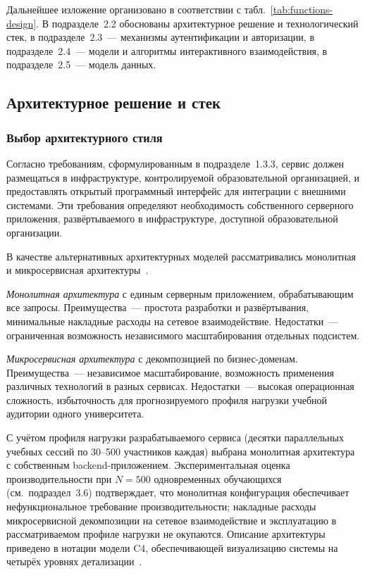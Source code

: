 Дальнейшее изложение организовано в соответствии с табл.~\ref{tab:functions-design}.
В подразделе~2.2 обоснованы архитектурное решение и технологический
стек, в подразделе~2.3~--- механизмы аутентификации и авторизации,
в подразделе~2.4~--- модели и алгоритмы интерактивного взаимодействия,
в подразделе~2.5~--- модель данных.

\subsection{Архитектурное решение и стек}

\subsubsection{Выбор архитектурного стиля}

Согласно требованиям, сформулированным в подразделе~1.3.3, сервис
должен размещаться в инфраструктуре, контролируемой образовательной
организацией, и предоставлять открытый программный интерфейс
для интеграции с внешними системами. Эти требования определяют
необходимость собственного серверного приложения, развёртываемого
в инфраструктуре, доступной образовательной организации.

В качестве альтернативных архитектурных моделей рассматривались
монолитная и микросервисная архитектуры~\cite{fowler_poeaa,kleppmann2017}.

\emph{Монолитная архитектура} с единым серверным приложением,
обрабатывающим все запросы. Преимущества~--- простота разработки
и развёртывания, минимальные накладные расходы на сетевое
взаимодействие. Недостатки~--- ограниченная возможность
независимого масштабирования отдельных подсистем.

\emph{Микросервисная архитектура} с декомпозицией по бизнес-доменам.
Преимущества~--- независимое масштабирование, возможность применения
различных технологий в разных сервисах. Недостатки~--- высокая
операционная сложность, избыточность для прогнозируемого профиля
нагрузки учебной аудитории одного университета.

С учётом профиля нагрузки разрабатываемого сервиса (десятки
параллельных учебных сессий по 30--500 участников каждая) выбрана
монолитная архитектура с собственным backend-приложением.
Экспериментальная оценка производительности при $N = 500$
одновременных обучающихся (см.~подраздел~3.6) подтверждает, что
монолитная конфигурация обеспечивает нефункциональное требование
производительности; накладные расходы микросервисной декомпозиции
на сетевое взаимодействие и эксплуатацию в рассматриваемом профиле
нагрузки не окупаются. Описание
архитектуры приведено в нотации модели C4, обеспечивающей
визуализацию системы на четырёх уровнях детализации~\cite{brown_c4}.

